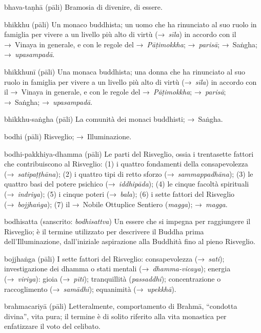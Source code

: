 \begin{glossarydescription}
\item[bhava-taṇhā] (pāli) Bramosia di divenire, di essere.

\item[bhikkhu] (pāli) Un monaco buddhista; un uomo che ha rinunciato al suo
  ruolo in famiglia per vivere a un livello più alto di virtù (→~\emph{sīla}) in
  accordo con il →~Vinaya in generale, e con le regole del →~\emph{Pāṭimokkha};
  →~\emph{parisā}; →~Saṅgha; →~\emph{upasampadā}.

\item[bhikkhunī] (pāli) Una monaca buddhista; una donna che ha rinunciato al suo
  ruolo in famiglia per vivere a un livello più alto di virtù (→~\emph{sīla}) in
  accordo con il →~Vinaya in generale, e con le regole del →~\emph{Pāṭimokkha};
  →~\emph{parisā}; →~Saṅgha; →~\emph{upasampadā}.

\item[bhikkhu-saṅgha] (pāli) La comunità dei monaci buddhisti; →~Saṅgha.

\item[bodhi] (pāli) Risveglio; →~Illuminazione.

\item[bodhi-pakkhiya-dhamma] (pāli) Le parti del Risveglio, ossia i trentasette
  fattori che contribuiscono al Risveglio: (1) i quattro fondamenti della
  consapevolezza (→~\emph{satipaṭṭhāna}); (2) i quattro tipi di retto sforzo
  (→~\emph{sammappadhāna}); (3) le quattro basi del potere psichico
  (→~\emph{iddhipāda}); (4) le cinque facoltà spirituali (→~\emph{indriya}); (5)
  i cinque poteri (→~\emph{bala}); (6) i sette fattori del Risveglio
  (→~\emph{bojjhaṅga}); (7) il →~Nobile Ottuplice Sentiero (\emph{magga});
  →~\emph{magga}.

\item[bodhisatta] (sanscrito: \emph{bodhisattva}) Un essere che si impegna per
  raggiungere il Risveglio; è il termine utilizzato per descrivere il Buddha
  prima dell'Illuminazione, dall'iniziale aspirazione alla Buddhità fino al
  pieno Risveglio.

\item[bojjhaṅga] (pāli)\label{glossary-bojjhanga} I sette fattori del Risveglio: consapevolezza
  (→~\emph{sati}); investigazione dei dhamma o stati mentali
  (→~\emph{dhamma-vicaya}); energia (→~\emph{viriya}): gioia (→~\emph{pīti});
  tranquillità (\emph{passaddhi}); concentrazione o raccoglimento
  (→~\emph{samādhi}); equanimità (→~\emph{upekkhā}).

\item[brahmacariyā] (pāli) Letteralmente, comportamento di Brahmā, ``condotta
  divina'', vita pura; il termine è di solito riferito alla vita monastica per
  enfatizzare il voto del celibato.


\end{glossarydescription}
